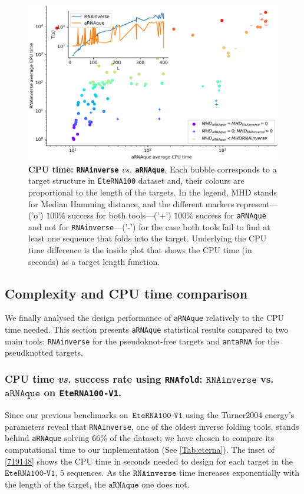 \begin{figure}[t!]
	\begin{center}
		\includegraphics[width=0.98\columnwidth]{../res/images/arnaque/cpuvssuccess.pdf}
		\caption{\textbf{\ac{CPU} time: \texttt{RNAinverse} $vs.$ \texttt{aRNAque}}. Each bubble corresponds to a target structure in \texttt{EteRNA100} dataset and, their colours are proportional to the length of the targets. In the legend, MHD stands for Median Hamming distance, and the different markers represent---('o') $100\%$ success for both tools---('+') $100\%$ success for \texttt{aRNAque} and not for \texttt{RNAinverse}---('-') for the case both tools fail to find at least one sequence that folds into the target. Underlying the \ac{CPU} time difference is the inside plot that shows the \ac{CPU} time (in seconds) as a target length function.}
		\label{719148}
	\end{center}
\end{figure}
\subsection{Complexity and CPU time comparison}
{\label{sec:complexity}}
We finally analysed the design performance of \texttt{aRNAque} relatively to the \ac{CPU} time needed. This section presents \texttt{aRNAque} statistical results compared to two main tools: \texttt{RNAinverse} for the pseudoknot-free targets and \texttt{antaRNA} for the pseudknotted targets. 
\subsubsection{CPU time \emph{vs.} success rate using \texttt{RNAfold}:  \(\texttt{RNAinverse}\) vs. \(\texttt{aRNAque}\) on \texttt{EteRNA100-V1}. } 
Since our previous benchmarks on~\(\texttt{EteRNA100-V1}\) using the Turner2004 energy's parameters reveal that \texttt{RNAinverse}, one of the oldest inverse folding tools, stands behind \texttt{aRNAque} solving $66\%$ of the dataset; we have chosen to compare its computational time to our implementation (See \autoref{Tab:eterna}).
The inset of {\autoref{719148}} shows the \ac{CPU} time in seconds needed to design for each target in the \(\texttt{EteRNA100-V1}\), \(5\) sequences. As the \(\texttt{RNAinverse}\) time increases exponentially with the length of the target, the \(\texttt{aRNAque}\) one does not. 

